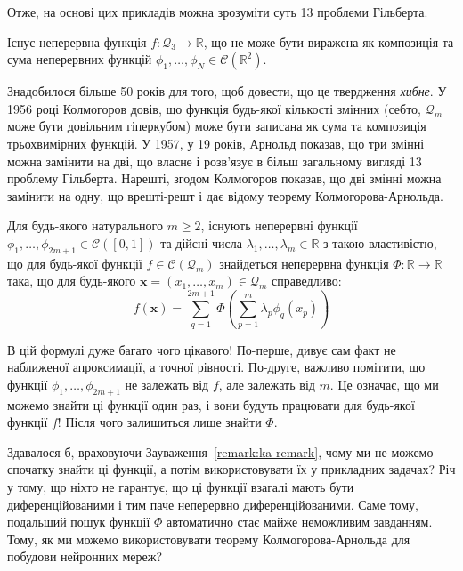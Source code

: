 Отже, на основі цих прикладів можна зрозуміти суть 13 проблеми Гільберта.
\begin{statement}
	Існує неперервна функція $f: \mathcal{Q}_3 \to \mathbb{R}$, що не може бути
	виражена як композиція та сума неперервних функцій $\phi_1,\dots,\phi_N \in
	\mathcal{C}(\mathbb{R}^2)$.
\end{statement}

Знадобилося більше 50 років для того, щоб довести, що це твердження
\textit{хибне}. У 1956 році Колмогоров довів, що функція будь-якої кількості
змінних (себто, $\mathcal{Q}_m$ може бути довільним гіперкубом) може бути
записана як сума та композиція трьохвимірних функцій. У 1957, у 19 років,
Арнольд показав, що три змінні можна замінити на дві, що власне і розв'язує в
більш загальному вигляді 13 проблему Гільберта. Нарешті, згодом Колмогоров 
показав, що дві змінні можна замінити на одну, що врешті-решт і дає 
відому теорему Колмогорова-Арнольда.

\begin{theorem}
	Для будь-якого натурального $m \geq 2$, існують неперервні функції
	$\phi_1,\dots,\phi_{2m+1} \in \mathcal{C}([0,1])$ та дійсні числа
	$\lambda_1,\dots,\lambda_m \in \mathbb{R}$ з такою властивістю, що для
	будь-якої функції $f \in \mathcal{C}(\mathcal{Q}_m)$ знайдеться неперервна
	функція $\Phi: \mathbb{R} \to \mathbb{R}$ така, що для будь-якого
	$\mathbf{x} = (x_1,\dots,x_m) \in \mathcal{Q}_m$ справедливо:
	\begin{equation*}
		f(\mathbf{x}) = \sum_{q=1}^{2m+1}\Phi\left(\sum_{p=1}^{m}\lambda_p\phi_q(x_p)\right)
	\end{equation*}
\end{theorem}

\begin{remark}\label{remark:ka-remark}
	В цій формулі дуже багато чого цікавого! По-перше, дивує сам факт не наближеної
	апроксимації, а точної рівності. По-друге, важливо помітити, що функції
	$\phi_1,\dots,\phi_{2m+1}$ не залежать від $f$, але залежать від $m$. Це
	означає, що ми можемо знайти ці функції один раз, і вони будуть працювати для
	будь-якої функції $f$! Після чого залишиться лише знайти $\Phi$.
\end{remark}

Здавалося б, враховуючи Зауваження~\ref{remark:ka-remark}, чому ми не можемо
спочатку знайти ці функції, а потім використовувати їх у прикладних задачах?
Річ у тому, що ніхто не гарантує, що ці функції взагалі мають бути диференційованими
і тим паче неперервно диференційованими. Саме тому, подальший пошук функції $\Phi$
автоматично стає майже неможливим завданням. Тому, як ми можемо використовувати
теорему Колмогорова-Арнольда для побудови нейронних мереж?


